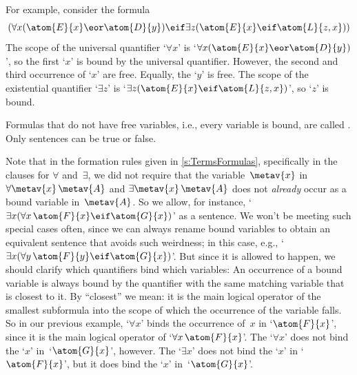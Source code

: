 
For example, consider the formula
	$$(\forall x(\atom{E}{x} \eor \atom{D}{y}) \eif \exists z(\atom{E}{x} \eif \atom{L}{z,x}))$$
The scope of the universal quantifier `$\forall x$' is `$\forall x (\atom{E}{x} \eor \atom{D}{y})$', so the first `$x$' is bound by the universal quantifier. However, the second and third occurrence of `$x$' are free. Equally, the `$y$' is free. The scope of the existential quantifier `$\exists z$' is `$\exists z(\atom{E}{x} \eif \atom{L}{z,x})$', so `$z$' is bound.

Formulas that do not have free variables, i.e., every variable is
bound, are called . Only sentences can be true or false.


Note that in the formation rules given in \cref{s:TermsFormulas},
specifically in the clauses for $\forall$ and~$\exists$, we did not
require that the variable~$\metav{x}$ in $\forall\metav{x}\,
\metav{A}$ and $\exists\metav{x}\,\metav{A}$ does not \emph{already}
occur as a bound variable in~$\metav{A}$. So we allow, for instance,
`$\exists x(\forall x\,\atom{F}{x} \eif \atom{G}{x})$' as a sentence. We
won't be meeting such special cases often, since we can always rename
bound variables to obtain an equivalent sentence that avoids such
weirdness; in this case, e.g., `$\exists x(\forall y\,\atom{F}{y} \eif
\atom{G}{x})$'. But since it is allowed to happen, we should clarify
which quantifiers bind which variables: An occurrence of a bound
variable is always bound by the quantifier with the same matching
variable that is closest to it. By ``closest'' we mean: it is the main
logical operator of the smallest subformula into the scope of which
the occurrence of the variable falls. So in our previous example,
`$\forall x$' binds the occurrence of~$x$ in `$\atom{F}{x}$', since it is
the main logical operator of `$\forall x\,\atom{F}{x}$'. The `$\forall x$'
does not bind the `$x$' in~`$\atom{G}{x}$', however. The `$\exists x$' does
not bind the `$x$' in `$\atom{F}{x}$', but it does bind the `$x$'
in~`$\atom{G}{x}$'.

